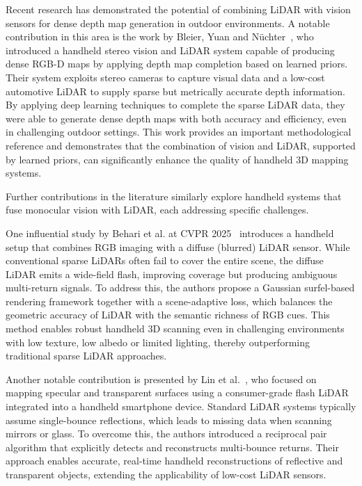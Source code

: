 \documentclass[english, bachelor, utf8]{base/thesis_telematics}
\begin{document}
Recent research has demonstrated the potential of combining LiDAR with vision sensors for dense depth map 
generation in outdoor environments. A notable contribution in this area is the work by Bleier, Yuan and 
Nüchter~\cite{bleier2024}, who introduced a handheld stereo vision and LiDAR system capable of producing dense 
RGB-D maps by applying depth map completion based on learned priors. Their system exploits stereo cameras to 
capture visual data and a low-cost automotive LiDAR to supply sparse but metrically accurate depth information. 
By applying deep learning techniques to complete the sparse LiDAR data, they were able to generate dense depth 
maps with both accuracy and efficiency, even in challenging outdoor settings. This work provides an important 
methodological reference and demonstrates that the combination of vision and LiDAR, supported by learned priors, 
can significantly enhance the quality of handheld 3D mapping systems.

Further contributions in the literature similarly explore handheld systems that fuse monocular 
vision with LiDAR, each addressing specific challenges.

One influential study by Behari et al. at CVPR 2025~\cite{behari2025blurred} introduces a handheld setup that 
combines RGB imaging with a diffuse (blurred) LiDAR sensor. While conventional sparse 
LiDARs often fail to cover the entire scene, the diffuse LiDAR emits a wide-field flash, improving 
coverage but producing ambiguous multi-return signals. To address this, the authors propose a 
Gaussian surfel-based rendering framework together with a scene-adaptive loss, 
which balances the geometric accuracy of LiDAR with the semantic richness of RGB cues. This method 
enables robust handheld 3D scanning even in challenging environments with low texture, low albedo
or limited lighting, thereby outperforming traditional sparse LiDAR approaches.

Another notable contribution is presented by Lin et al.~\cite{lin2024lidarmirror}, who focused on 
mapping specular and transparent surfaces using a consumer-grade flash LiDAR integrated 
into a handheld smartphone device. Standard LiDAR systems typically assume single-bounce 
reflections, which leads to missing data when scanning mirrors or glass. To overcome this, the 
authors introduced a reciprocal pair algorithm that explicitly detects and reconstructs 
multi-bounce returns. Their approach enables accurate, real-time handheld reconstructions of 
reflective and transparent objects, extending the applicability of low-cost LiDAR sensors.
\end{document}
